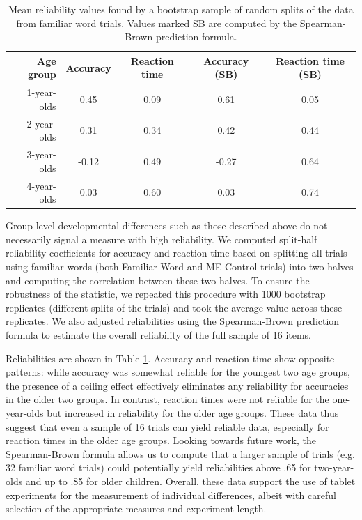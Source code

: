 \documentclass[man,noapacite]{apa2}
\begin{document}
\begin{table}[t]
\centering
\caption{\label{tab:reliability} Mean reliability values found by a bootstrap sample of random splits of the data from familiar word trials. Values marked SB are computed by the Spearman-Brown prediction formula.}
\begin{tabular}{rcccc}
  \hline
Age group & Accuracy & Reaction time & Accuracy (SB) & Reaction time (SB) \\ 
  \hline
1-year-olds & 0.45 & 0.09 & 0.61 & 0.05 \\ 
2-year-olds & 0.31 & 0.34 & 0.42 & 0.44 \\ 
3-year-olds & -0.12 & 0.49 & -0.27 & 0.64 \\ 
4-year-olds & 0.03 & 0.60 & 0.03 & 0.74 \\ 
   \hline
\end{tabular}
\end{table}

Group-level developmental differences such as those described above do not necessarily signal a measure with high reliability. We computed split-half reliability coefficients for accuracy and reaction time based on splitting all trials using familiar words (both Familiar Word and ME Control trials) into two halves and computing the correlation between these two halves. To ensure the robustness of the statistic, we repeated this procedure with 1000 bootstrap replicates (different splits of the trials) and took the average value across these replicates. We also adjusted reliabilities using the Spearman-Brown prediction formula \cite{bartko1976} to estimate the overall reliability of the full sample of 16 items.

Reliabilities are shown in Table \ref{tab:reliability}. Accuracy and reaction time show opposite patterns: while accuracy was somewhat reliable for the youngest two age groups, the presence of a ceiling effect effectively eliminates any reliability for accuracies in the older two groups. In contrast, reaction times were not reliable for the one-year-olds but increased in reliability for the older age groups. These data thus suggest that even a sample of 16 trials can yield reliable data, especially for reaction times in the older age groups. Looking towards future work, the Spearman-Brown formula allows us to compute that a larger sample of trials (e.g. 32 familiar word trials) could potentially yield reliabilities above .65 for two-year-olds and up to .85 for older children. Overall, these data support the use of tablet experiments for the measurement of individual differences, albeit with careful selection of the appropriate measures and experiment length. 
\end{document}
